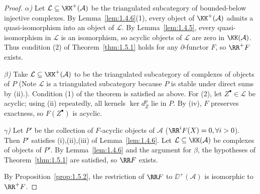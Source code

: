 \begin{proof}
\emph{$\alpha$)} Let $\mathcal{L}\subseteq\KK^+(\mathcal{A})$ be the triangulated subcategory of bounded-below injective complexes. By Lemma~\ref{lem:1.4.6}(1), every object of $\KK^+(\mathcal{A})$ admits a quasi-isomorphism into an object of $\mathcal{L}$. By Lemma~\ref{lem:1.4.5}, every quasi-isomorphism in $\mathcal{L}$ is an isomorphism, so acyclic objects of $\mathcal{L}$ are zero in $\KK(\mathcal{A})$. Thus condition (2) of Theorem~\ref{thm:1.5.1} holds for any $\partial$-functor $F$, so $\RR^+F$ exists.

\emph{$\beta$)} Take $\mathcal{L}\subseteq\KK^+(\mathcal{A})$ to be the triangulated
subcategory of complexes of objects of $P$ (Note $\mathcal{L}$ is a
triangulated subcategory because $P$ is stable under direct sums
by (ii).). Condition (1) of the theorem is satisfied as above. For (2), let $Z^\bullet\in\mathcal{L}$ be acyclic; using (ii) repeatedly, all kernels $\ker d_Z^p$ lie in $P$. By (iv), $F$ preserves exactness, so $F(Z^\bullet)$ is acyclic.

\emph{$\gamma$)} Let $P'$ be the collection of $F$-acyclic objects of $\mathcal{A}$ ($\RR^iF(X)=0,\forall i>0$). Then $P'$ satisfies (i),(ii),(iii) of Lemma~\ref{lem:1.4.6}. Let $\mathcal{L}\subseteq\KK(\mathcal{A})$ be complexes of objects of $P'$. By Lemma~\ref{lem:1.4.6} and the argument for $\beta$, the hypotheses of Theorem~\ref{thm:1.5.1} are satisfied, so $\RR F$ exists.

By Proposition~\ref{prop:1.5.2}, the restriction of $\RR F$ to $\DD^+(\mathcal{A})$ is isomorphic to $\RR^+F$.
\end{proof}


